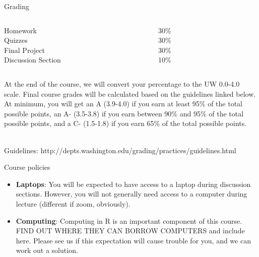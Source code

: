 \documentclass[10pt,t]{beamer}
\begin{document}
\begin{frame}{Grading}
\begin{columns}
	\begin{column}[t]{0.4\textwidth}
		Homework \\
		Quizzes \\
		Final Project \\
		Discussion Section 
	\end{column}
	\begin{column}[t]{0.4\textwidth}  %
		30\% \\
		30\% \\
		30\% \\
		10\% 
	\end{column}
\end{columns}

\vspace{1cm}

At the end of the course, we will convert your percentage to the UW 0.0-4.0 scale. Final course grades will be calculated based on the guidelines linked below. At minimum, you will get an A (3.9-4.0) if you earn at least 95\% of the total possible points, an A- (3.5-3.8) if you earn between 90\% and 95\% of the total possible points, and a C- (1.5-1.8) if you earn 65\% of the total possible points. \\~\

Guidelines: http://depts.washington.edu/grading/practices/guidelines.html 

\end{frame}

\begin{frame}{Course policies}
\begin{itemize}
	\item \textbf{Laptops}: You will be expected to have access to a laptop during discussion sections. However, you will not generally need access to a computer during lecture (different if zoom, obviously).
	\item \textbf{Computing}: Computing in R is an important component of this course. FIND OUT WHERE THEY CAN BORROW COMPUTERS and include here. Please see us if this expectation will cause trouble for you, and we can work out a solution.
\end{itemize}
\end{frame}
\end{document}
